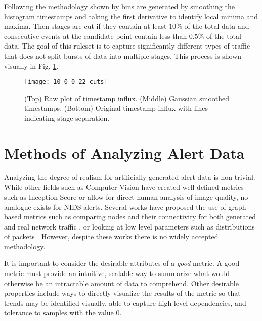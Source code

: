 Following the methodology shown by \cite{us} bins are generated by smoothing the histogram timestamps and taking the first derivative to identify local minima and maxima. Then stages are cut if they contain at least $10\%$ of the total data and consecutive events at the candidate point contain less than $0.5\%$ of the total data. The goal of this ruleset is to capture significantly different types of traffic that does not split bursts of data into multiple stages. This process is shown visually in Fig. \ref{fig:cut_process}.



\begin{figure}[!htbp]
	\centering%
	\texttt{[image: 10\_0\_0\_22\_cuts]}
	\caption{
		(Top) Raw plot of timestamp influx.
		(Middle) Gaussian smoothed timestamps.
		(Bottom) Original timestamp influx with lines indicating stage separation. 
	}
	\label{fig:cut_process}
\end{figure}

\section{Methods of Analyzing Alert Data}

Analyzing the degree of realism for artificially generated alert data is non-trivial. While other fields such as Computer Vision have created well defined metrics such as Inception Score \cite{Salimans2016} or allow for direct human analysis of image quality, no analogue exists for NIDS alerts. Several works have proposed the use of graph based metrics such as comparing nodes and their connectivity for both generated and real network traffic \cite{Siska2010, Iannucci}, or looking at low level parameters such as distributions of packets \cite{Sommers2004, Botta2012}. However, despite these works there is no widely accepted methodology.

It is important to consider the desirable attributes of a \emph{good} metric. A good metric must provide an intuitive, scalable way to summarize what would otherwise be an intractable amount of data to comprehend. Other desirable properties include ways to directly visualize the results of the metric so that trends may be identified visually, able to capture high level dependencies, and tolerance to samples with the value $0$. 

